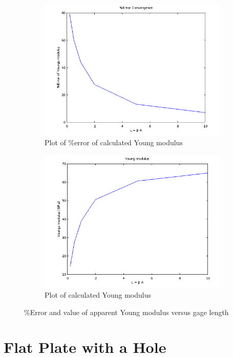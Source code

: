 \documentclass[paper=a4, fontsize=11pt]{scrartcl} %
\numberwithin{equation}{section} %
\numberwithin{figure}{section} %
\numberwithin{table}{section} %
\begin{document}
\begin{figure}[h]
\centering
	\begin{subfigure}[b]{0.45\textwidth}
		\includegraphics[width=\textwidth]{q2_error.png}
		\caption{Plot of \%error of calculated Young modulus}
		\label{fig:q2fig1}
	\end{subfigure}
	\hfill
	\begin{subfigure}[b]{0.45\textwidth}
		\includegraphics[width=\textwidth]{q2_youngmod.png}
		\caption{Plot of calculated Young modulus}
		\label{fig:q2fig2}
	\end{subfigure}
	\caption{\%Error and value of apparent Young modulus versus gage length}
\end{figure}

\newpage
\section{Flat Plate with a Hole}

\end{document}
